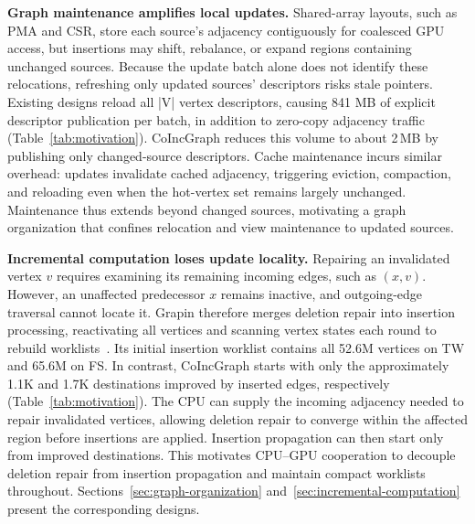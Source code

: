 \textbf{Graph maintenance amplifies local updates.} Shared-array layouts, such as PMA and CSR, store each source's adjacency contiguously for coalesced GPU access, but insertions may shift, rebalance, or expand regions containing unchanged sources. Because the update batch alone does not identify these relocations, refreshing only updated sources' descriptors risks stale pointers. Existing designs reload all |V| vertex descriptors, causing 841 MB of explicit descriptor publication per batch, in addition to zero-copy adjacency traffic (Table~\ref{tab:motivation}). CoIncGraph reduces this volume to about 2\,MB by publishing only changed-source descriptors. Cache maintenance incurs similar overhead: updates invalidate cached adjacency, triggering eviction, compaction, and reloading even when the hot-vertex set remains largely unchanged. Maintenance thus extends beyond changed sources, motivating a graph organization that confines relocation and view maintenance to updated sources.

\textbf{Incremental computation loses update locality.} Repairing an invalidated vertex $v$ requires examining its remaining incoming edges, such as $(x,v)$. However, an unaffected predecessor $x$ remains inactive, and outgoing-edge traversal cannot locate it. Grapin therefore merges deletion repair into insertion processing, reactivating all vertices and scanning vertex states each round to rebuild worklists~\cite{2025-Grapin}. Its initial insertion worklist contains all 52.6M vertices on TW and 65.6M on FS. In contrast, CoIncGraph starts with only the approximately 1.1K and 1.7K destinations improved by inserted edges, respectively (Table~\ref{tab:motivation}). The CPU can supply the incoming adjacency needed to repair invalidated vertices, allowing deletion repair to converge within the affected region before insertions are applied. Insertion propagation can then start only from improved destinations. This motivates CPU--GPU cooperation to decouple deletion repair from insertion propagation and maintain compact worklists throughout. Sections~\ref{sec:graph-organization} and~\ref{sec:incremental-computation} present the corresponding designs.

